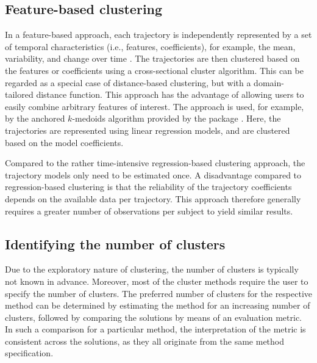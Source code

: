\subsection{Feature-based clustering}\label{feature-based-clustering}

In a feature-based approach, each trajectory is independently represented by a set of temporal characteristics (i.e., features, coefficients), for example, the mean, variability, and change over time \citep{liao2005clustering}. The trajectories are then clustered based on the features or coefficients using a cross-sectional cluster algorithm. This can be regarded as a special case of distance-based clustering, but with a domain-tailored distance function. This approach has the advantage of allowing users to easily combine arbitrary features of interest. The approach is used, for example, by the anchored \(k\)-medoids algorithm provided by the  package \citep{Adepeju2020akmedoids}. Here, the trajectories are represented using linear regression models, and are clustered based on the model coefficients.

Compared to the rather time-intensive regression-based clustering approach, the trajectory models only need to be estimated once. A disadvantage compared to regression-based clustering is that the reliability of the trajectory coefficients depends on the available data per trajectory. This approach therefore generally requires a greater number of observations per subject to yield similar results.

\subsection{Identifying the number of clusters}\label{identifying-the-number-of-clusters}

Due to the exploratory nature of clustering, the number of clusters is typically not known in advance. Moreover, most of the cluster methods require the user to specify the number of clusters. The preferred number of clusters for the respective method can be determined by estimating the method for an increasing number of clusters, followed by comparing the solutions by means of an evaluation metric. In such a comparison for a particular method, the interpretation of the metric is consistent across the solutions, as they all originate from the same method specification.

